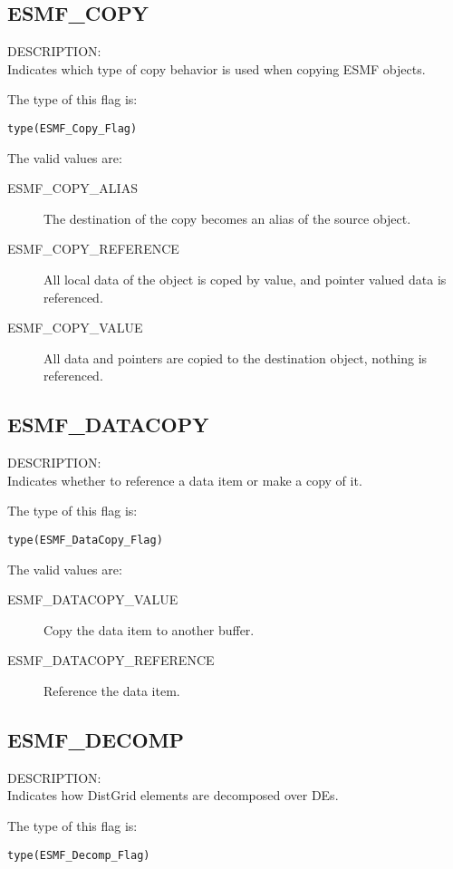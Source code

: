 \subsection{ESMF\_COPY}
\label{const:copy}
{\sf DESCRIPTION:\\}
Indicates which type of copy behavior is used when copying ESMF objects.

The type of this flag is:

{\tt type(ESMF\_Copy\_Flag)}

The valid values are:
\begin{description}
	\item[ESMF\_COPY\_ALIAS]
	The destination of the copy becomes an alias of the source object.
	\item[ESMF\_COPY\_REFERENCE]
	All local data of the object is coped by value, and pointer valued data is referenced.
	\item[ESMF\_COPY\_VALUE]
	All data and pointers are copied to the destination object, nothing is referenced.
\end{description}

\subsection{ESMF\_DATACOPY}
\label{const:datacopyflag}
{\sf DESCRIPTION:\\}
Indicates whether to reference a data item or make a copy of it.

The type of this flag is:

{\tt type(ESMF\_DataCopy\_Flag)}

The valid values are:
\begin{description}
\item [ESMF\_DATACOPY\_VALUE]
      Copy the data item to another buffer.
\item [ESMF\_DATACOPY\_REFERENCE]
      Reference the data item.
\end{description}

\subsection{ESMF\_DECOMP}
\label{const:decompflag}
{\sf DESCRIPTION:\\}
Indicates how DistGrid elements are decomposed over DEs.

The type of this flag is:

{\tt type(ESMF\_Decomp\_Flag)}


